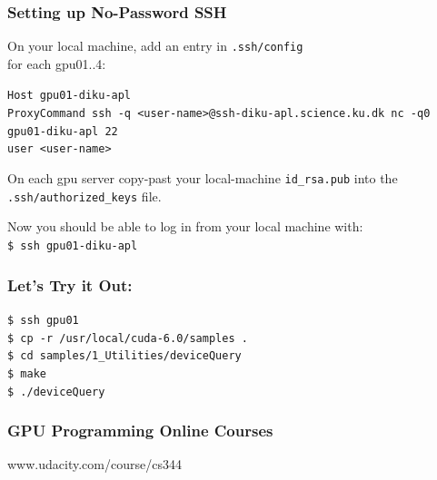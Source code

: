 \documentclass{beamer}
\newcommand{\emp}[1]{\textcolor{DikuRed}{ #1}}
\begin{document}
\begin{frame}[fragile,t]
\frametitle{Setting up No-Password SSH}

\emp{On your local machine, add an entry in {\tt .ssh/config}\\ for each gpu01..4:}\\
\medskip

\begin{scriptsize}
{\tt Host gpu01-diku-apl}\\
{\tt ProxyCommand ssh -q <user-name>@ssh-diku-apl.science.ku.dk nc -q0 gpu01-diku-apl 22}\\
{\tt user <user-name>}
\end{scriptsize}
\bigskip

\emp{On each gpu server copy-past your local-machine {\tt id\_rsa.pub} into
the {\tt .ssh/authorized\_keys} file.}

\medskip

Now you should be able to log in from your local machine with:\\
{\tt\$ ssh gpu01-diku-apl}

\end{frame}


\begin{frame}[fragile,t]
\frametitle{Let's Try it Out:}

{\tt \$ ssh gpu01}\medskip\\
{\tt \$ cp -r /usr/local/cuda-6.0/samples .}\medskip\\
{\tt \$ cd samples/1\_Utilities/deviceQuery}\medskip\\
{\tt \$ make}\medskip\\
{\tt \$ ./deviceQuery}\medskip\\

\end{frame}

\begin{frame}[fragile,t]
\frametitle{GPU Programming Online Courses}

www.udacity.com/course/cs344

\end{frame}
\end{document}
